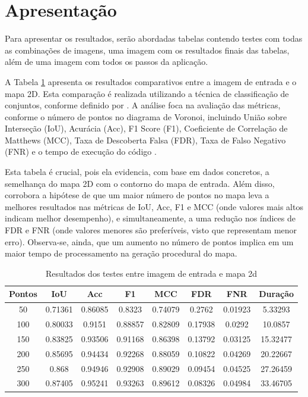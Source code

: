 \section{Apresentação}

Para apresentar os resultados, serão abordadas tabelas contendo testes com todas as combinações de imagens, uma imagem com os resultados finais das tabelas, além de uma imagem com todos os passos da aplicação.

A Tabela \ref{tab:final_input_output_2d} apresenta os resultados comparativos entre a imagem de entrada e o mapa 2D. Esta comparação é realizada utilizando a técnica de classificação de conjuntos, conforme definido por \cite{kirillov2019panoptic}. A análise foca na avaliação das métricas, conforme o número de pontos no diagrama de Voronoi, incluindo União sobre Interseção (IoU), Acurácia (Acc), F1 Score (F1), Coeficiente de Correlação de Matthews (MCC), Taxa de Descoberta Falsa (FDR), Taxa de Falso Negativo (FNR) e o tempo de execução do código \cite{Chicco2020, confusion_matrix_calculator, iou_metric_link}.

Esta tabela é crucial, pois ela evidencia, com base em dados concretos, a semelhança do mapa 2D com o contorno do mapa de entrada. Além disso, corrobora a hipótese de que um maior número de pontos no mapa leva a melhores resultados nas métricas de IoU, Acc, F1 e MCC (onde valores mais altos indicam melhor desempenho), e simultaneamente, a uma redução nos índices de FDR e FNR (onde valores menores são preferíveis, visto que representam menor erro). Observa-se, ainda, que um aumento no número de pontos implica em um maior tempo de processamento na geração procedural do mapa.

\begin{table}[h]
	\centering
	\caption{Resultados dos testes entre imagem de entrada e mapa 2d}
	\label{tab:final_input_output_2d}
	\begin{tabular}{|c|c|c|c|c|c|c|c|}
		\hline
						Pontos & IoU & Acc & F1 & MCC & FDR & FNR & Duração \\
		\hline
		50 & 0.71361 & 0.86085 & 0.8323 & 0.74079 & 0.2762 & 0.01923 & 5.33293\\
100 & 0.80033 & 0.9151 & 0.88857 & 0.82809 & 0.17938 & 0.0292 & 10.0857\\
150 & 0.83825 & 0.93506 & 0.91168 & 0.86398 & 0.13792 & 0.03125 & 15.32477\\
200 & 0.85695 & 0.94434 & 0.92268 & 0.88059 & 0.10822 & 0.04269 & 20.22667\\
250 & 0.868 & 0.94946 & 0.92908 & 0.89029 & 0.09454 & 0.04525 & 27.26459\\
300 & 0.87405 & 0.95241 & 0.93263 & 0.89612 & 0.08326 & 0.04984 & 33.46705\\
		\hline
	\end{tabular}
\end{table}


